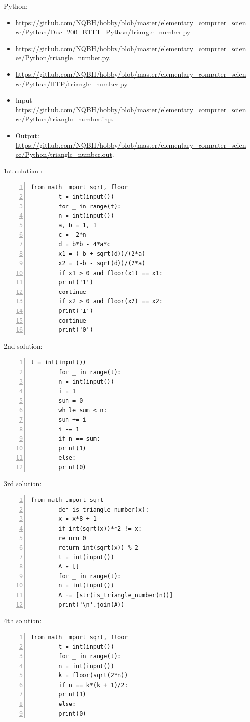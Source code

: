 \documentclass{article}
\begin{document}
Python:
\begin{itemize}
	\item \url{https://github.com/NQBH/hobby/blob/master/elementary_computer_science/Python/Duc_200_BTLT_Python/triangle_number.py}.
	\item \url{https://github.com/NQBH/hobby/blob/master/elementary_computer_science/Python/triangle_number.py}.
	\item \url{https://github.com/NQBH/hobby/blob/master/elementary_computer_science/Python/HTP/triangle_number.py}.
	\item Input: \url{https://github.com/NQBH/hobby/blob/master/elementary_computer_science/Python/triangle_number.inp}.
	\item Output: \url{https://github.com/NQBH/hobby/blob/master/elementary_computer_science/Python/triangle_number.out}.
\end{itemize}

\begin{multicols}{2}
	1st solution \cite[6., pp. 204--205]{Duc_200_BT_Python}:
	\begin{Verbatim}[numbers=left,xleftmargin=5mm]
		from math import sqrt, floor
		t = int(input())
		for _ in range(t):
		n = int(input())
		a, b = 1, 1
		c = -2*n
		d = b*b - 4*a*c
		x1 = (-b + sqrt(d))/(2*a)
		x2 = (-b - sqrt(d))/(2*a)
		if x1 > 0 and floor(x1) == x1:
		print('1')
		continue
		if x2 > 0 and floor(x2) == x2:
		print('1')
		continue
		print('0')
	\end{Verbatim}
	\columnbreak
	2nd solution:
	\begin{Verbatim}[numbers=left,xleftmargin=5mm]
		t = int(input())
		for _ in range(t):
		n = int(input())
		i = 1
		sum = 0
		while sum < n:
		sum += i
		i += 1
		if n == sum:
		print(1)
		else:
		print(0)
	\end{Verbatim}
\end{multicols}

\begin{multicols}{2}
	3rd solution:
	\begin{Verbatim}[numbers=left,xleftmargin=5mm]
		from math import sqrt
		def is_triangle_number(x):
		x = x*8 + 1
		if int(sqrt(x))**2 != x:
		return 0
		return int(sqrt(x)) % 2
		t = int(input())
		A = []
		for _ in range(t):
		n = int(input())
		A += [str(is_triangle_number(n))]
		print('\n'.join(A))
	\end{Verbatim}
	\columnbreak
	4th solution:
	\begin{Verbatim}[numbers=left,xleftmargin=5mm]
		from math import sqrt, floor
		t = int(input())
		for _ in range(t):
		n = int(input())
		k = floor(sqrt(2*n))
		if n == k*(k + 1)/2:
		print(1)
		else:
		print(0)
	\end{Verbatim}
\end{multicols}
\end{document}
